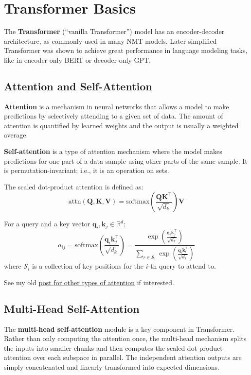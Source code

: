 \documentclass[12pt]{article}
\begin{document}
\section{Transformer Basics}
The \textbf{Transformer} (``vanilla Transformer'') model has an encoder-decoder architecture, as commonly used in many NMT models. Later simplified Transformer was shown to achieve great performance in language modeling tasks, like in encoder-only BERT or decoder-only GPT.

\subsection{Attention and Self-Attention}
\textbf{Attention} is a mechanism in neural networks that allows a model to make predictions by selectively attending to a given set of data. The amount of attention is quantified by learned weights and the output is usually a weighted average.

\textbf{Self-attention} is a type of attention mechanism where the model makes predictions for one part of a data sample using other parts of the same sample. It is permutation-invariant; i.e., it is an operation on sets.

The scaled dot-product attention is defined as:
\[
\text{attn}(\mathbf{Q}, \mathbf{K}, \mathbf{V}) = \text{softmax}\left(\frac{\mathbf{Q} \mathbf{K}^\top}{\sqrt{d_k}}\right)\mathbf{V}
\]

For a query and a key vector $\mathbf{q}_i, \mathbf{k}_j \in \mathbb{R}^d$:
\[
a_{ij} = \text{softmax}\left(\frac{\mathbf{q}_i \mathbf{k}_j^\top}{\sqrt{d_k}}\right)
= \frac{\exp\left(\frac{\mathbf{q}_i \mathbf{k}_j^\top}{\sqrt{d_k}}\right)}{ \sum_{r \in \mathcal{S}_i} \exp\left(\frac{\mathbf{q}_i \mathbf{k}_r^\top}{\sqrt{d_k}}\right) }
\]
where $\mathcal{S}_i$ is a collection of key positions for the $i$-th query to attend to.

See my old \href{https://lilianweng.github.io/posts/2018-06-24-attention/#a-family-of-attention-mechanisms}{post for other types of attention} if interested.

\subsection{Multi-Head Self-Attention}
The \textbf{multi-head self-attention} module is a key component in Transformer. Rather than only computing the attention once, the multi-head mechanism splits the inputs into smaller chunks and then computes the scaled dot-product attention over each subspace in parallel. The independent attention outputs are simply concatenated and linearly transformed into expected dimensions.
\end{document}
